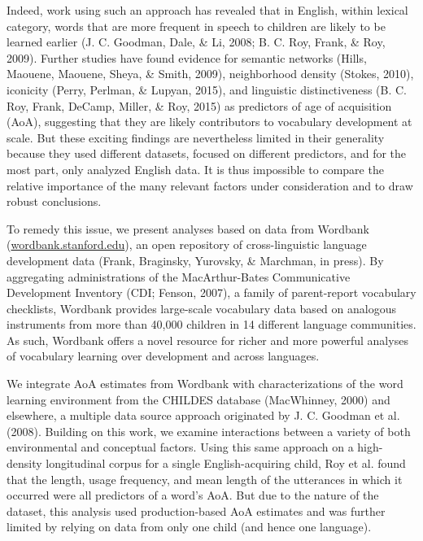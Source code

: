 \documentclass[10pt, letterpaper]{article}
\begin{document}
Indeed, work using such an approach has revealed that in English, within
lexical category, words that are more frequent in speech to children are
likely to be learned earlier (J. C. Goodman, Dale, \& Li, 2008; B. C.
Roy, Frank, \& Roy, 2009). Further studies have found evidence for
semantic networks (Hills, Maouene, Maouene, Sheya, \& Smith, 2009),
neighborhood density (Stokes, 2010), iconicity (Perry, Perlman, \&
Lupyan, 2015), and linguistic distinctiveness (B. C. Roy, Frank, DeCamp,
Miller, \& Roy, 2015) as predictors of age of acquisition (AoA),
suggesting that they are likely contributors to vocabulary development
at scale. But these exciting findings are nevertheless limited in their
generality because they used different datasets, focused on different
predictors, and for the most part, only analyzed English data. It is
thus impossible to compare the relative importance of the many relevant
factors under consideration and to draw robust conclusions.

To remedy this issue, we present analyses based on data from Wordbank
(\href{http://wordbank.stanford.edu}{wordbank.stanford.edu}), an open
repository of cross-linguistic language development data (Frank,
Braginsky, Yurovsky, \& Marchman, in press). By aggregating
administrations of the MacArthur-Bates Communicative Development
Inventory (CDI; Fenson, 2007), a family of parent-report vocabulary
checklists, Wordbank provides large-scale vocabulary data based on
analogous instruments from more than 40,000 children in 14 different
language communities. As such, Wordbank offers a novel resource for
richer and more powerful analyses of vocabulary learning over
development and across languages.

We integrate AoA estimates from Wordbank with characterizations of the
word learning environment from the CHILDES database (MacWhinney, 2000)
and elsewhere, a multiple data source approach originated by J. C.
Goodman et al. (2008). Building on this work, we examine interactions
between a variety of both environmental and conceptual factors. Using
this same approach on a high-density longitudinal corpus for a single
English-acquiring child, Roy et al. found that the length, usage
frequency, and mean length of the utterances in which it occurred were
all predictors of a word's AoA. But due to the nature of the dataset,
this analysis used production-based AoA estimates and was further
limited by relying on data from only one child (and hence one language).
\end{document}
